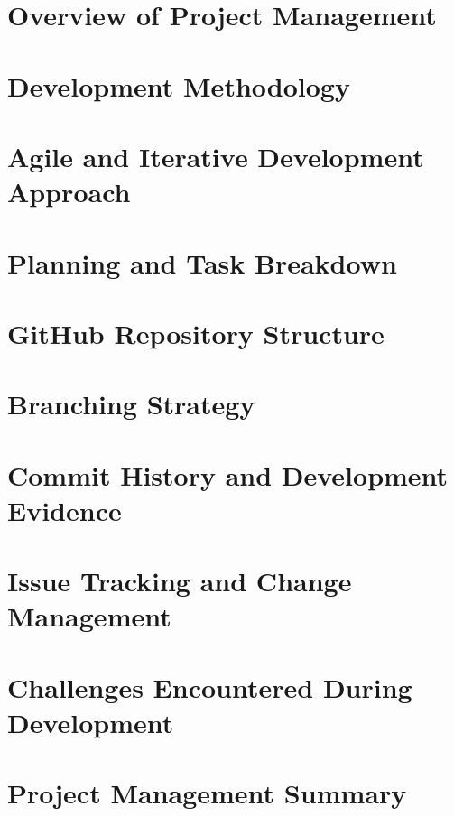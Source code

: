 
\raggedright

\section{Overview of Project Management}

\section{Development Methodology}

\section{Agile and Iterative Development Approach}

\section{Planning and Task Breakdown}

\section{GitHub Repository Structure}

\section{Branching Strategy}

\section{Commit History and Development Evidence}

\section{Issue Tracking and Change Management}

\section{Challenges Encountered During Development}

\section{Project Management Summary}